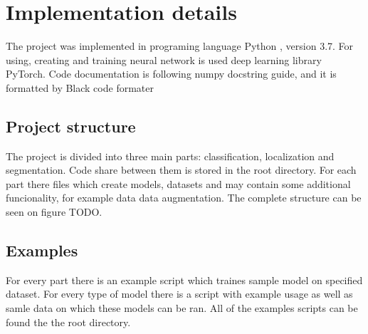 \documentclass[twoside]{ctuthesis}
\theoremstyle{plain}
\theoremstyle{definition}
\theoremstyle{note}
\begin{document}
\chapter{Implementation details}
The project was implemented in programing language Python \cite{Python}, version 3.7.
For using, creating and training neural network is used deep learning library PyTorch\cite{PyTorch}.
Code documentation is following numpy docstring guide, and it is formatted by Black code 
formater \cite{Black}


\section{Project structure}
The project is divided into three main parts: classification, localization and segmentation.
Code share between them is stored in the root directory. For each part there files which create
models, datasets and may contain some additional funcionality, for example data data augmentation.
The complete structure can be seen on figure TODO.

\section{Examples}
For every part there is an example script which traines sample model on specified dataset. For
every type of model there is a script with example usage as well as samle data on which these 
models can be ran. All of the examples scripts can be found the the root directory.

\printindex

\appendix




\end{document}
